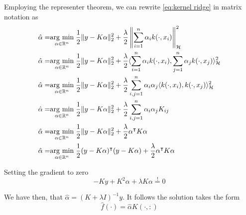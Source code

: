 Employing the representer theorem, we can rewrite \ref{eq:kernel ridge} in matrix notation as
\begin{equation}
    \begin{aligned}
    \hat{\alpha}=&\underset{\alpha \in \mathbb{R}^n}{\operatorname{arg}\,\operatorname{min}}\;\frac{1}{2}\|y-K\alpha\|_2^2+\frac{\lambda}{2}\left\|\sum _{i=1}^{n}\alpha _{i}k(\cdot ,x_{i})\right\|_{\mathcal{H}}^2
    \\
    \hat{\alpha}=&\underset{\alpha \in \mathbb{R}^n}{\operatorname{arg}\,\operatorname{min}}\;\frac{1}{2}\|y-K\alpha\|_2^2+\frac{\lambda}{2} \langle \sum _{i=1}^{n}\alpha _{i}k(\cdot ,x_{i}),\sum _{j=1}^{n}\alpha _{j}k(\cdot ,x_{j})\rangle_{\mathcal{H}}^2
    \\
    \hat{\alpha}=&\underset{\alpha \in \mathbb{R}^n}{\operatorname{arg}\,\operatorname{min}}\;\frac{1}{2}\|y-K\alpha\|_2^2+\frac{\lambda}{2} \sum _{i,j=1}^{n}\alpha _{i}\alpha _{j}\langle k(\cdot ,x_{i}),k(\cdot ,x_{j})\rangle_{\mathcal{H}}^2
    \\
    \hat{\alpha}=&\underset{\alpha \in \mathbb{R}^n}{\operatorname{arg}\,\operatorname{min}}\;\frac{1}{2}\|y-K\alpha\|_2^2+\frac{\lambda}{2} \sum _{i,j=1}^{n}\alpha _{i}\alpha _{j}K_{ij}
    \\
    \hat{\alpha}=&\underset{\alpha \in \mathbb{R}^n}{\operatorname{arg}\,\operatorname{min}}\;\frac{1}{2}\|y-K\alpha\|_2^2+\frac{\lambda}{2} \alpha^\intercal K \alpha
    \\
    \hat{\alpha}=&\underset{\alpha \in \mathbb{R}^n}{\operatorname{arg}\,\operatorname{min}}\;\frac{1}{2}(y-K\alpha)^\intercal (y-K\alpha)+\frac{\lambda}{2} \alpha^\intercal K \alpha
\end{aligned}
\end{equation}

Setting the gradient to zero
\begin{equation}
    -Ky+K^2\alpha+\lambda K \alpha\overset{!}{=}0
\end{equation}

We have then, that $\hat{\alpha}=(K+\lambda I)^{-1}y$. It follows the solution takes the form
\begin{equation}
    \hat{f}(\cdot)=\hat{\alpha}K(\cdot,:)
\end{equation}

